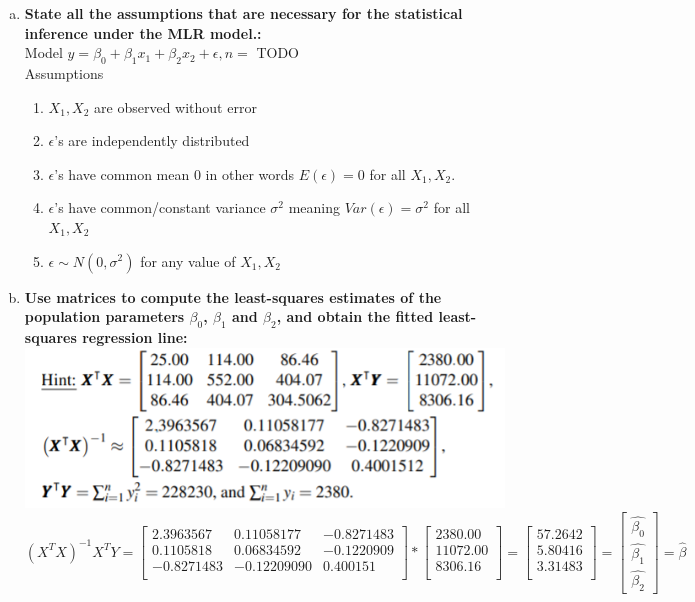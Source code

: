 \documentclass{article}
\begin{document}
\begin{enumerate}[(a)]
\item \textbf{State all the assumptions that are necessary for the statistical inference under the MLR model.: } \\
Model $y = \beta_0 + \beta_1x_1 + \beta_2x_2 + \epsilon, n = $ TODO \\
Assumptions
  \begin{enumerate}[(1)]
   \item $X_1, X_2$ are observed without error
   \item $\epsilon$'s are independently distributed
   \item $\epsilon$'s have common mean 0 in other words $E(\epsilon) = 0$ for all $X_1,X_2$.
   \item $\epsilon$'s have common/constant variance $\sigma^2$ meaning $Var(\epsilon) = \sigma^2$ for all $X_1,X_2$
  \item $\epsilon \sim N(0, \sigma^2)$ for any value of $X_1, X_2$
\end{enumerate}

\item \textbf{Use matrices to compute the least-squares estimates of the population parameters $\beta_0$, $\beta_1$ and $\beta_2$, and obtain the fitted least-squares regression line:  \\
\includegraphics{a3_hint}} \\

$(X^TX)^{-1} X^TY = \begin{bmatrix}
2.3963567 & 0.11058177 & -0.8271483 \\
0.1105818 & 0.06834592 & -0.1220909 \\
-0.8271483 & -0.12209090 & 0.400151 \\
\end{bmatrix} * 
\begin{bmatrix}
2380.00 \\
11072.00 \\
8306.16 \\
\end{bmatrix}= 
\begin{bmatrix}
57.2642 \\
5.80416 \\
3.31483 \\
\end{bmatrix} = 
\begin{bmatrix}
    \hat{\beta_0} \\
    \hat{\beta_1} \\
    \hat{\beta_2}
\end{bmatrix} = \hat{\beta}$



\end{enumerate}
\end{document}
